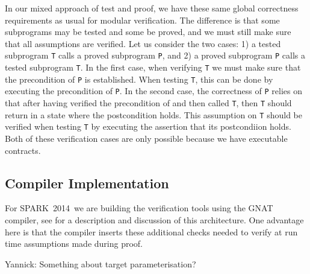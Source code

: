 \documentclass[sttt,draft]{svjour}
\newcommand{\newspark}{SPARK~2014\xspace}
\begin{document}
In our mixed approach of test and proof, we have these same global
correctness requirements as usual for modular verification. The
difference is that some subprograms may be tested and some be proved,
and we must still make sure that all assumptions are verified. Let us
consider the two cases: 1) a tested subprogram \verb|T| calls a proved
subprogram \verb|P|, and 2) a proved subprogram \verb|P| calls a
tested subprogram \verb|T|. In the first case, when verifying \verb|T|
we must make sure that the precondition of \verb|P| is
established. When testing \verb|T|, this can be done by executing the
precondition of \verb|P|. In the second case, the correctness of
\verb|P| relies on that after having verified the precondition of and
then called \verb|T|, then \verb|T| should return in a state where the
postcondition holds. This assumption on \verb|T| should be verified
when testing \verb|T| by executing the assertion that its postcondiion
holds. Both of these verification cases are only possible because we
have executable contracts.

\subsection{Compiler Implementation}
For \newspark\ we are building the verification tools using the GNAT
compiler, see \cite{ksd2012} for a description and discussion of this
architecture. One advantage here is that the compiler inserts these
additional checks needed to verify at run time assumptions made during
proof.

Yannick: Something about target parameterisation?
\end{document}
